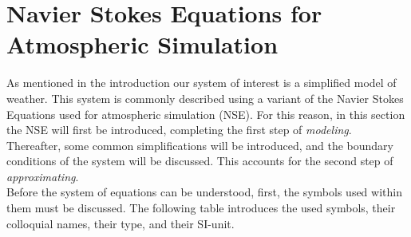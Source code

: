 \chapter{Navier Stokes Equations for Atmospheric Simulation}\label{chapter:navier_stokes}
As mentioned in the introduction our system of interest is a simplified model of weather.
This system is commonly described using a variant of the Navier Stokes Equations used for atmospheric simulation (NSE).
For this reason, in this section the NSE will first be introduced, completing the first step of \emph{modeling}.
Thereafter, some common simplifications will be introduced, and the boundary conditions of the system will be discussed.
This accounts for the second step of \emph{approximating}.\\

Before the system of equations can be understood, first, the symbols used within them must be discussed.
The following table introduces the used symbols, their colloquial names, their type, and their SI-unit.

